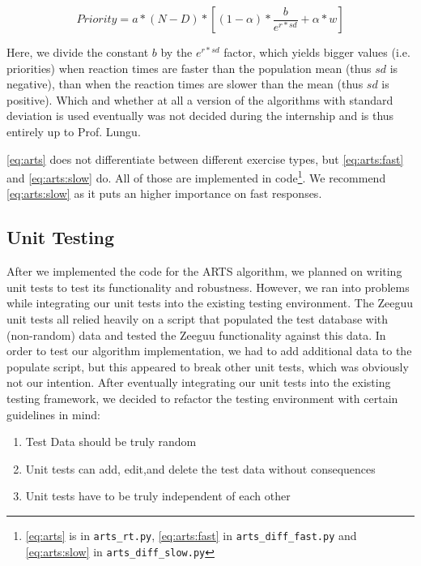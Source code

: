 \documentclass{article}
\begin{document}
\begin{equation}\label{eq:arts:slow}
Priority = a * (N-D) * [(1 - \alpha) * \frac{b}{e^{r * sd}} + \alpha * w]
\end{equation}

Here, we divide the constant $b$ by the $e^{r * sd}$ factor, which yields bigger values (i.e. priorities) when reaction times are faster than the population mean (thus $sd$ is negative), than when the reaction times are slower than the mean (thus $sd$ is positive). Which and whether at all a version of the algorithms with standard deviation is used eventually was not decided during the internship and is thus entirely up to Prof. Lungu.

\autoref{eq:arts} does not differentiate between different exercise types, but \autoref{eq:arts:fast} and \autoref{eq:arts:slow} do. All of those are implemented in code\footnote{\autoref{eq:arts} is in \lstinline|arts_rt.py|, \autoref{eq:arts:fast} in \lstinline|arts_diff_fast.py| and \autoref{eq:arts:slow} in \lstinline|arts_diff_slow.py|}. We recommend \autoref{eq:arts:slow} as it puts an higher importance on fast responses.

\subsection{Unit Testing}
After we implemented the code for the ARTS algorithm, we planned on writing unit tests to test its functionality and robustness. However, we ran into problems while integrating our unit tests into the existing testing environment. The Zeeguu unit tests all relied heavily on a script that populated the test database with (non-random) data and tested the Zeeguu functionality against this data. In order to test our algorithm implementation, we had to add additional data to the populate script, but this appeared to break other unit tests, which was obviously not our intention. After eventually integrating our unit tests into the existing testing framework, we decided to refactor the testing environment with certain guidelines in mind:

\begin{enumerate}
    \item Test Data should be truly random
    \item Unit tests can add, edit,and delete the test data without consequences
    \item Unit tests have to be truly independent of each other
\end{enumerate}
\end{document}
